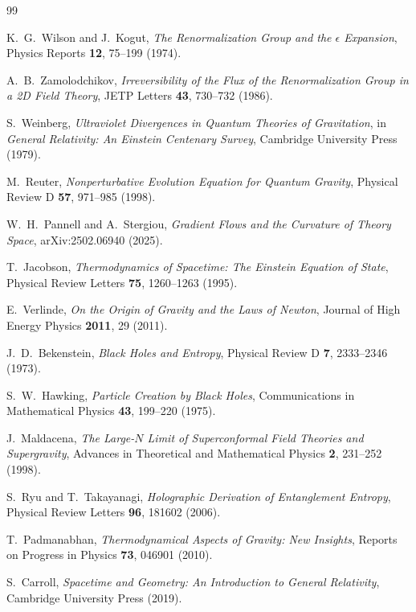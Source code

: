 \documentclass[12pt,a4paper]{article}
\theoremstyle{plain}
\theoremstyle{definition}
\theoremstyle{remark}
\begin{document}
\begin{thebibliography}{99}

K.~G.~Wilson and J.~Kogut,
\emph{The Renormalization Group and the $\epsilon$ Expansion},
Physics Reports \textbf{12}, 75--199 (1974).

A.~B.~Zamolodchikov,
\emph{Irreversibility of the Flux of the Renormalization Group in a 2D Field Theory},
JETP Letters \textbf{43}, 730--732 (1986).

S.~Weinberg,
\emph{Ultraviolet Divergences in Quantum Theories of Gravitation},
in \emph{General Relativity: An Einstein Centenary Survey},
Cambridge University Press (1979).

M.~Reuter,
\emph{Nonperturbative Evolution Equation for Quantum Gravity},
Physical Review D \textbf{57}, 971--985 (1998).

W.~H.~Pannell and A.~Stergiou,
\emph{Gradient Flows and the Curvature of Theory Space},
arXiv:2502.06940 (2025).

T.~Jacobson,
\emph{Thermodynamics of Spacetime: The Einstein Equation of State},
Physical Review Letters \textbf{75}, 1260--1263 (1995).

E.~Verlinde,
\emph{On the Origin of Gravity and the Laws of Newton},
Journal of High Energy Physics \textbf{2011}, 29 (2011).

J.~D.~Bekenstein,
\emph{Black Holes and Entropy},
Physical Review D \textbf{7}, 2333--2346 (1973).

S.~W.~Hawking,
\emph{Particle Creation by Black Holes},
Communications in Mathematical Physics \textbf{43}, 199--220 (1975).

J.~Maldacena,
\emph{The Large-$N$ Limit of Superconformal Field Theories and Supergravity},
Advances in Theoretical and Mathematical Physics \textbf{2}, 231--252 (1998).

S.~Ryu and T.~Takayanagi,
\emph{Holographic Derivation of Entanglement Entropy},
Physical Review Letters \textbf{96}, 181602 (2006).

T.~Padmanabhan,
\emph{Thermodynamical Aspects of Gravity: New Insights},
Reports on Progress in Physics \textbf{73}, 046901 (2010).

S.~Carroll,
\emph{Spacetime and Geometry: An Introduction to General Relativity},
Cambridge University Press (2019).


\end{thebibliography}
\end{document}
